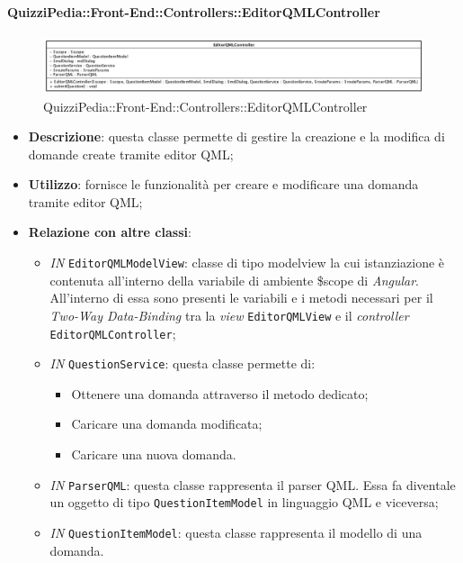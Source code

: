 \paragraph{QuizziPedia::Front-End::Controllers::EditorQMLController}
\begin{figure} [ht]
	\centering
	\includegraphics[scale=0.30]{UML/Classi/Front-End/QuizziPedia_Front-end_Controller_EditorQMLController.png}
	\caption{QuizziPedia::Front-End::Controllers::EditorQMLController}
\end{figure} \FloatBarrier
\begin{itemize}
	\item \textbf{Descrizione}: questa classe permette di gestire la creazione e la modifica di domande create tramite editor QML;
	\item \textbf{Utilizzo}: fornisce le funzionalità per creare e modificare una domanda tramite editor QML;
	\item \textbf{Relazione con altre classi}:
	\begin{itemize}
		\item \textit{IN} \texttt{EditorQMLModelView}: classe di tipo modelview la cui istanziazione è contenuta all'interno della variabile di ambiente \$scope di \textit{Angular}. All'interno di essa sono presenti le variabili e i metodi necessari per il \textit{Two-Way Data-Binding} tra la \textit{view} \texttt{EditorQMLView} e il \textit{controller} \texttt{EditorQMLController};
		\item \textit{IN} \texttt{QuestionService}: questa classe permette di:
		\begin{itemize}
			\item Ottenere una domanda attraverso il metodo dedicato;
			\item Caricare una domanda modificata;
			\item Caricare una nuova domanda.
		\end{itemize}
		\item \textit{IN} \texttt{ParserQML}: questa classe rappresenta il parser QML. Essa fa diventale un oggetto di tipo \texttt{QuestionItemModel} in linguaggio QML e viceversa;
		\item \textit{IN} \texttt{QuestionItemModel}: questa classe rappresenta il modello di una domanda.
	\end{itemize}

\end{itemize}
